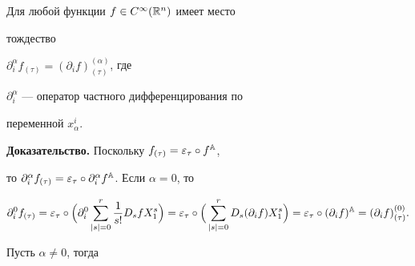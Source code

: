  


\begin{props} Для любой функции $f\in C^\infty(\Bbb R^n)$ имеет место 


тождество 


$\partial^\alpha_i f_{(\tau)}=(\partial_i f)^{(\alpha)}_{(\tau)}$, где 


$\partial^\alpha_i$ --- оператор частного дифференцирования по 


переменной $x^i_\alpha$. 


\end{props} 


 


{\bf Доказательство.} Поскольку $f_{(\tau)}=\varepsilon_\tau\circ f^{\Bbb A}$, 


то $\partial^\alpha_i f_{(\tau)}=\varepsilon_\tau\circ 


\partial^\alpha_i f\A$. Если $\alpha=0$, то 


$$ 


\partial^0_i f_{(\tau)}=\varepsilon_\tau\circ\Big( 


\partial^0_i\sum^r_{|s|=0}\frac{1}{s!}D_s f X^s_1\Big)= 


\varepsilon_\tau\circ\Big(\sum^r_{|s|=0}D_s 


(\partial_i f)X^s_1\Big)= 


\varepsilon_\tau\circ(\partial_i f)\A= 


(\partial_i f)^{(0)}_{(\tau)}. 


$$ 


Пусть $\alpha\ne 0$, тогда 


